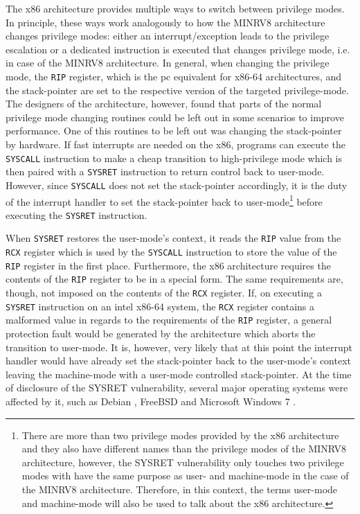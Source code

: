The x86 architecture provides multiple ways to switch between privilege modes.
In principle, these ways work analogously to how the MINRV8 architecture changes privilege modes: either an interrupt/exception leads to the privilege escalation or a dedicated instruction is executed that changes privilege mode, i.e.  in case of the MINRV8 architecture.
In general, when changing the privilege mode, the \lstinline{RIP} register, which is the \gls{pc} equivalent for x86-64 architectures, and the stack-pointer are set to the respective version of the targeted privilege-mode.
The designers of the architecture, however, found that parts of the normal privilege mode changing routines could be left out in some scenarios to improve performance.
One of this routines to be left out was changing the stack-pointer by hardware.
If fast interrupts are needed on the x86, programs can execute the \lstinline{SYSCALL} instruction to make a cheap transition to high-privilege mode which is then paired with a \lstinline{SYSRET} instruction to return control back to user-mode.
However, since \lstinline{SYSCALL} does not set the stack-pointer accordingly, it is the duty of the interrupt handler to set the stack-pointer back to user-mode\footnote{%
    There are more than two privilege modes provided by the x86 architecture and they also have different names than the privilege modes of the MINRV8 architecture, however, the SYSRET vulnerability only touches two privilege modes with have the same purpose as user- and machine-mode in the case of the MINRV8 architecture.
    Therefore, in this context, the terms user-mode and machine-mode will also be used to talk about the x86 architecture.
} before executing the \lstinline{SYSRET} instruction.

When \lstinline{SYSRET} restores the user-mode's context, it reads the \lstinline{RIP} value from the \lstinline{RCX} register which is used by the \lstinline{SYSCALL} instruction to store the value of the \lstinline{RIP} register in the first place.
Furthermore, the x86 architecture requires the contents of the \lstinline{RIP} register to be in a special form.
The same requirements are, though, not imposed on the contents of the \lstinline{RCX} register.
If, on executing a \lstinline{SYSRET} instruction on an intel x86-64 system, the \lstinline{RCX} register contains a malformed value in regards to the requirements of the \lstinline{RIP} register, a general protection fault would be generated by the architecture which aborts the transition to user-mode.
It is, however, very likely that at this point the interrupt handler would have already set the stack-pointer back to the user-mode's context leaving the machine-mode with a user-mode controlled stack-pointer.
At the time of disclosure of the SYSRET vulnerability, several major operating systems were affected by it, such as Debian \cite{SYSRETDebian}, FreeBSD \cite{SYSRETFreeBSD} and Microsoft Windows 7 \cite{SYSRETMicrosoft}.

